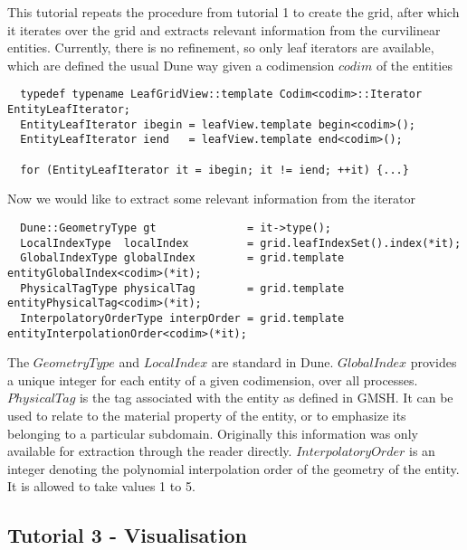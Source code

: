\documentclass[12pt]{article}
\begin{document}
This tutorial repeats the procedure from tutorial 1 to create the grid, after which it iterates over the grid and extracts relevant information from the curvilinear entities. Currently, there is no refinement, so only leaf iterators are available, which are defined the usual Dune way given a codimension $codim$ of the entities\\

\begin{mybox}
\begin{lstlisting}
  typedef typename LeafGridView::template Codim<codim>::Iterator EntityLeafIterator;
  EntityLeafIterator ibegin = leafView.template begin<codim>();
  EntityLeafIterator iend   = leafView.template end<codim>();
  
  for (EntityLeafIterator it = ibegin; it != iend; ++it) {...}
\end{lstlisting}
\end{mybox}


Now we would like to extract some relevant information from the iterator \\
\begin{mybox}
\begin{lstlisting}
  Dune::GeometryType gt              = it->type();
  LocalIndexType  localIndex         = grid.leafIndexSet().index(*it);
  GlobalIndexType globalIndex        = grid.template entityGlobalIndex<codim>(*it);
  PhysicalTagType physicalTag        = grid.template entityPhysicalTag<codim>(*it);
  InterpolatoryOrderType interpOrder = grid.template entityInterpolationOrder<codim>(*it);
\end{lstlisting}
\end{mybox}

The $GeometryType$ and $LocalIndex$ are standard in Dune. $GlobalIndex$ provides a unique integer for each entity of a given codimension, over all processes. $PhysicalTag$ is the tag associated with the entity as defined in GMSH. It can be used to relate to the material property of the entity, or to emphasize its belonging to a particular subdomain. Originally this information was only available for extraction through the reader directly. $InterpolatoryOrder$ is an integer denoting the polynomial interpolation order of the geometry of the entity. It is allowed to take values 1 to 5. \\






\subsection{Tutorial 3 - Visualisation}
\end{document}

